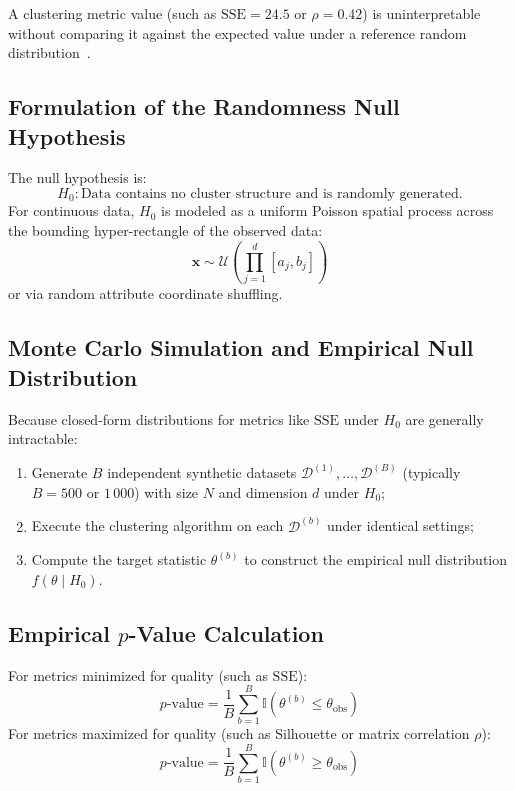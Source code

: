 A clustering metric value (such as $\mathrm{SSE} = 24.5$ or $\rho = 0.42$) is uninterpretable without comparing it against the expected value under a reference random distribution~\cite{tan2018, jain1988}.

\subsection{Formulation of the Randomness Null Hypothesis}
The null hypothesis is:
\begin{equation}
\label{eq:dm-null-hypothesis-en}
H_0: \text{Data contains no cluster structure and is randomly generated.}
\end{equation}
For continuous data, $H_0$ is modeled as a uniform Poisson spatial process across the bounding hyper-rectangle of the observed data:
\begin{equation}
\mathbf{x} \sim \mathcal{U}\left(\prod_{j=1}^d [a_j, b_j]\right)
\end{equation}
or via random attribute coordinate shuffling.

\subsection{Monte Carlo Simulation and Empirical Null Distribution}
Because closed-form distributions for metrics like $\mathrm{SSE}$ under $H_0$ are generally intractable:
\begin{enumerate}
    \item Generate $B$ independent synthetic datasets $\mathcal{D}^{(1)}, \dots, \mathcal{D}^{(B)}$ (typically $B=500$ or $1\,000$) with size $N$ and dimension $d$ under $H_0$;
    \item Execute the clustering algorithm on each $\mathcal{D}^{(b)}$ under identical settings;
    \item Compute the target statistic $\theta^{(b)}$ to construct the empirical null distribution $f(\theta \mid H_0)$.
\end{enumerate}

\subsection{Empirical $p$-Value Calculation}
For metrics minimized for quality (such as $\mathrm{SSE}$):
\begin{equation}
\label{eq:dm-p-value-minimization-en}
p\text{-value} = \frac{1}{B} \sum_{b=1}^B \mathbb{I}\left(\theta^{(b)} \le \theta_{\mathrm{obs}}\right)
\end{equation}
For metrics maximized for quality (such as Silhouette or matrix correlation $\rho$):
\begin{equation}
\label{eq:dm-p-value-maximization-en}
p\text{-value} = \frac{1}{B} \sum_{b=1}^B \mathbb{I}\left(\theta^{(b)} \ge \theta_{\mathrm{obs}}\right)
\end{equation}

